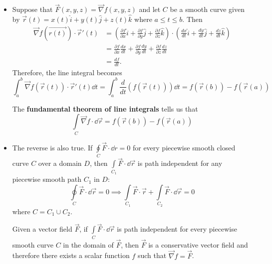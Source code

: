 \begin{itemize}
\begin{definition}
    \end{definition}
    \item Suppose that $\vec{F}(x,y,z)=\vec{\nabla}f(x,y,z)$ and let $C$ be a smooth curve given by $\vec{r}(t) = x(t)\hat{i} + y(t)\hat{j} + z(t)\hat{k}$ where $a\le t\le b.$ Then 
    \begin{align}
        \vec{\nabla}f(\vec{r(t)})\cdot \vec{r}'(t) &= \left(\frac{\partial f}{\partial x}\hat{i} + \frac{\partial f}{\partial y}\hat{j} + \frac{\partial f}{\partial z}\hat{k}\right)\cdot \left(\frac{dx}{dt}\hat{i} + \frac{dy}{dt}\hat{j} + \frac{dz}{dt}\hat{k}\right) \\ 
        &= \frac{\partial f}{\partial x}\frac{dx}{dt} + \frac{\partial f}{\partial y}\frac{dy}{dt} + \frac{\partial f}{\partial z}\frac{dz}{dt} \\ 
        &= \frac{df}{dt}.
    \end{align}
    Therefore, the line integral becomes 
    \begin{equation}
        \int_a^b \vec{\nabla}f(\vec{r}(t))\cdot \vec{r}'(t) \dd{t} = \int_a^b \frac{d}{dt} (f(\vec{r}(t)))\dd{t} = f(\vec{r}(b))-f(\vec{r}(a))
    \end{equation}
    \begin{theorem}
        The \textbf{fundamental theorem of line integrals} tells us that
        \begin{equation}
            \int\limits_C \vec{\nabla}f\cdot \dd{\vec{r}} = f(\vec{r}(b))-f(\vec{r}(a))
        \end{equation}
    \end{theorem}
    \item The reverse is also true. If $\oint\limits_C \vec{F} \cdot \dd{r} = 0$ for every piecewise smooth closed curve $C$ over a domain $D$, then $\int\limits_{C_1}\vec{F}\cdot \dd{\vec{r}}$ is path independent for any piecewise smooth path $C_1$ in $D$: 
    \begin{equation}
        \oint\limits_C \vec{F} \cdot \dd{\vec{r}} = 0 \implies \int\limits_{C_1}\vec{F}\cdot{\vec{r}} + \int\limits_{C_2}\vec{F}\cdot \dd{\vec{r}} = 0
    \end{equation}
    where 
    $C=C_1\cup C_2$.
    \begin{theorem}
        Given a vector field $\vec{F}$, if $\int\limits_C \vec{F}\cdot \dd{\vec{r}}$ is path independent for every piecewise smooth curve $C$ in the domain of $\vec{F}$, then $\vec{F}$ is a conservative vector field and therefore there exists a scalar function $f$ such that $\vec{\nabla}f=\vec{F}$.
    \end{theorem}

\end{itemize}
